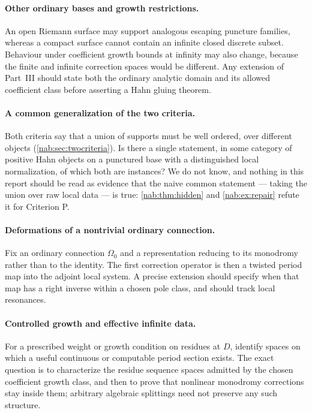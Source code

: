 \documentclass[11pt,letterpaper]{article}
\theoremstyle{definition}
\theoremstyle{remark}
\numberwithin{equation}{section}
\begin{document}
\paragraph{Other ordinary bases and growth restrictions.}
An open Riemann surface may support analogous escaping puncture families,
whereas a compact surface cannot contain an infinite closed discrete subset.
Behaviour under coefficient growth bounds at infinity may also change, because
the finite and infinite correction spaces would be different. Any extension of
Part~III should state both the ordinary analytic domain and its allowed
coefficient class before asserting a Hahn gluing theorem.

\paragraph{A common generalization of the two criteria.}
Both criteria say that a union of supports must be well ordered, over different
objects (\cref{nab:sec:twocriteria}). Is there a single statement, in some
category of positive Hahn objects on a punctured base with a distinguished
local normalization, of which both are instances? We do not know, and nothing
in this report should be read as evidence that the naive common statement ---
taking the union over raw local data --- is true: \cref{nab:thm:hidden} and
\cref{nab:ex:repair} refute it for Criterion P.

\paragraph{Deformations of a nontrivial ordinary connection.}
Fix an ordinary connection $\Omega_0$ and a representation reducing to its
monodromy rather than to the identity. The first correction operator is then a
twisted period map into the adjoint local system. A precise extension should
specify when that map has a right inverse within a chosen pole class, and
should track local resonances.

\paragraph{Controlled growth and effective infinite data.}
For a prescribed weight or growth condition on residues at $D$, identify
spaces on which a useful continuous or computable period section exists. The
exact question is to characterize the residue sequence spaces admitted by the
chosen coefficient growth class, and then to prove that nonlinear monodromy
corrections stay inside them; arbitrary algebraic splittings need not preserve
any such structure.
\end{document}

